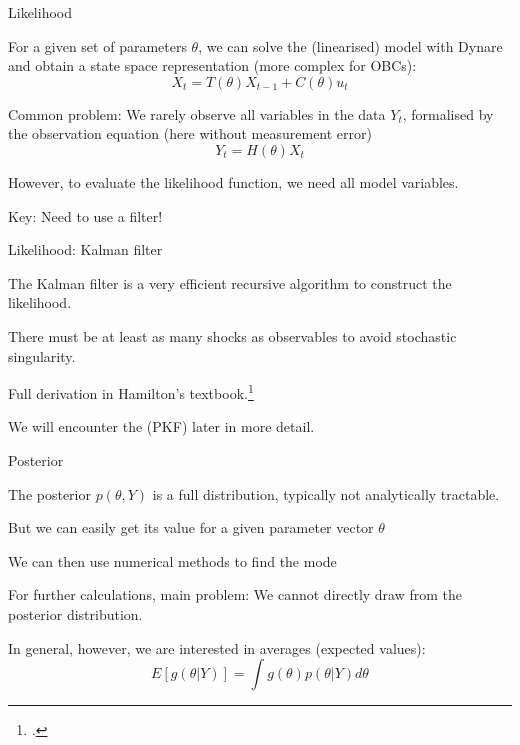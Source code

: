 \begin{frame}{Likelihood}
\begin{wideitemize}
\item For a given set of parameters $\theta$, we can solve the (linearised) model with Dynare and obtain a state space representation (more complex for OBCs):
\begin{equation*}
    X_t = T(\theta)X_{t-1} + C(\theta)u_t
\end{equation*}
\item Common problem: We rarely observe all variables in the data $Y_t$, formalised by the observation equation (here without measurement error)
\begin{equation*}
    Y_t = H(\theta)X_{t}
\end{equation*}
\item However, to evaluate the likelihood function, we need all model variables.
\item Key: Need to use a filter!
\end{wideitemize}
\end{frame}



\begin{frame}{Likelihood: Kalman filter}
\begin{wideitemize}
\item The Kalman filter is a very efficient recursive algorithm to construct the likelihood.
\item There must be at least as many shocks as observables to avoid stochastic singularity.
\item Full derivation in Hamilton's textbook.\footcite{hamilton2020time}
\item We will encounter the  (PKF) later in more detail.
\end{wideitemize}
\end{frame}


   
\begin{frame}{Posterior}
\begin{wideitemize}
\item The posterior $p(\theta,Y)$ is a full distribution, typically not analytically tractable.
\item But we can easily get its value for a given parameter vector $\theta$
\item We can then use numerical methods to find the mode %
\item For further calculations, main problem: We cannot directly draw from the posterior distribution.
\item In general, however, we are interested in averages (expected values):
\begin{equation*}
    E\left[g(\theta|Y)\right] = \int g(\theta)p\left(\theta|Y\right)d\theta
\end{equation*}
\end{wideitemize}
\end{frame}

